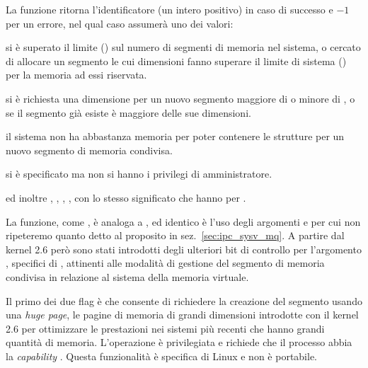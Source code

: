 \begin{funcproto}{
}

{La funzione ritorna l'identificatore (un intero positivo) in caso di successo
  e $-1$ per un errore, nel qual caso  assumerà uno dei valori:
  \begin{errlist}
    \item[\errcode{ENOSPC}] si è superato il limite () sul numero
      di segmenti di memoria nel sistema, o cercato di allocare un segmento le
      cui dimensioni fanno superare il limite di sistema () per
      la memoria ad essi riservata.
    \item[\errcode{EINVAL}] si è richiesta una dimensione per un nuovo segmento
      maggiore di  o minore di , o se il segmento
      già esiste  è maggiore delle sue dimensioni.
    \item[\errcode{ENOMEM}] il sistema non ha abbastanza memoria per poter
      contenere le strutture per un nuovo segmento di memoria condivisa.
    \item[\errcode{ENOMEM}] si è specificato  ma non si
      hanno i privilegi di amministratore.
   \end{errlist}
   ed inoltre , , ,
   , con lo stesso significato che hanno per .}
\end{funcproto}


La funzione, come , è analoga a , ed identico è
l'uso degli argomenti  e  per cui non ripeteremo quanto
detto al proposito in sez.~\ref{sec:ipc_sysv_mq}.  A partire dal kernel 2.6
però sono stati introdotti degli ulteriori bit di controllo per
l'argomento , specifici di , attinenti alle modalità
di gestione del segmento di memoria condivisa in relazione al sistema della
memoria virtuale.

Il primo dei due flag è  che consente di richiedere la
creazione del segmento usando una \textit{huge page}, le pagine di memoria di
grandi dimensioni introdotte con il kernel 2.6 per ottimizzare le prestazioni
nei sistemi più recenti che hanno grandi quantità di memoria. L'operazione è
privilegiata e richiede che il processo abbia la \textit{capability}
. Questa funzionalità è specifica di Linux e non è
portabile.


